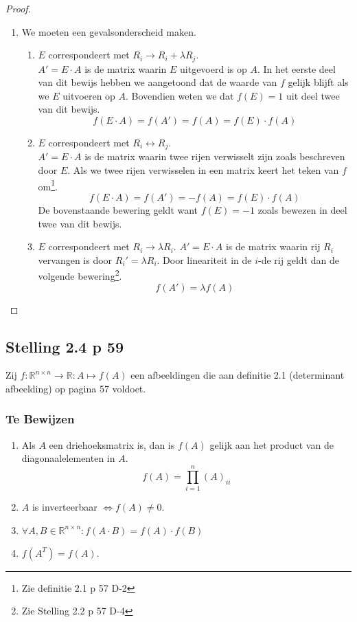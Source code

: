 \documentclass[lineaire_algebra_oplossingen.tex]{subfiles}
\begin{document}
\begin{proof}
\begin{enumerate}
\item
We moeten een gevalsonderscheid maken.
\begin{enumerate}
\item $E$ correspondeert met  $R_i \rightarrow R_i + \lambda R_j$.\\
$A' = E\cdot A$ is de matrix waarin $E$ uitgevoerd is op $A$. In het eerste deel van dit bewijs hebben we aangetoond dat de waarde van $f$ gelijk blijft als we $E$ uitvoeren op $A$. Bovendien weten we dat $f(E)=1$ uit deel twee van dit bewijs.
\[
f(E\cdot A) = f(A') = f(A) = f(E)\cdot f(A)
\]
\item $E$ correspondeert met  $R_i \leftrightarrow R_j$.\\
$A' = E\cdot A$ is de matrix waarin twee rijen verwisselt zijn zoals beschreven door $E$. Als we twee rijen verwisselen in een matrix keert het teken van $f$ om\footnote{Zie definitie 2.1 p 57 D-2}.
\[
f(E\cdot A) = f(A') = -f(A) = f(E)\cdot f(A)
\]
De bovenstaande bewering geldt want $f(E) = -1$ zoals bewezen in deel twee van dit bewijs.
\item $E$ correspondeert met $R_i \rightarrow \lambda R_i$.
$A' = E\cdot A$ is de matrix waarin rij $R_i$ vervangen is door $R_i' = \lambda R_i$. Door lineariteit in de $i$-de rij geldt dan de volgende bewering\footnote{Zie Stelling 2.2 p 57 D-4}.
\[
f(A') = \lambda f(A)
\]
\end{enumerate}
\end{enumerate}
\end{proof}

\subsection{Stelling 2.4 p 59}
Zij $f : \mathbb{R}^{n\times n} \rightarrow \mathbb{R}:A\mapsto f(A)$ een afbeeldingen die aan definitie 2.1 (determinant afbeelding) op pagina 57 voldoet.
\subsubsection*{Te Bewijzen}
\begin{enumerate}
\item Als $A$ een driehoeksmatrix is, dan is $f(A)$ gelijk aan het product van de diagonaalelementen in $A$.
\[
f(A) = \prod_{i=1}^n (A)_{ii}
\]
\item $A$ is inverteerbaar $\Leftrightarrow f(A) \neq 0$.
\item $\forall A,B \in \mathbb{R}^{n\times n}: f(A\cdot B) = f(A)\cdot f(B)$
\item $f(A^T) = f(A)$.
\end{enumerate}
\end{document}
